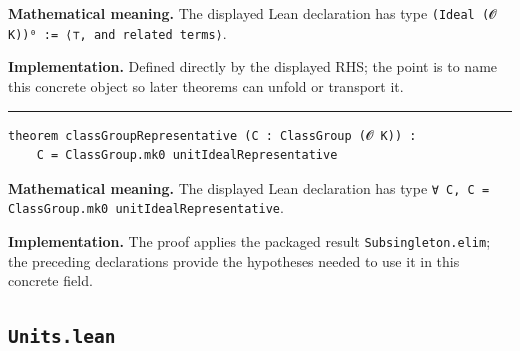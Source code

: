 \documentclass[UTF8,a4paper,11pt,fontset=fandol]{ctexart}
\theoremstyle{definition}
\newcommand{\statementsep}{\par\medskip\hrule\medskip}
\begin{document}
\noindent\textbf{Mathematical meaning.} The displayed Lean declaration has type \texttt{(Ideal (𝓞 K))⁰ := ⟨⊤, and related terms⟩}.\par
\noindent\textbf{Implementation.} Defined directly by the displayed RHS; the point is to name this concrete object so later theorems can unfold or transport it.\par
\statementsep
\begin{verbatim}
theorem classGroupRepresentative (C : ClassGroup (𝓞 K)) :
    C = ClassGroup.mk0 unitIdealRepresentative
\end{verbatim}
\noindent\textbf{Mathematical meaning.} The displayed Lean declaration has type \texttt{∀ C, C = ClassGroup.\allowbreak{}mk0 unitIdealRepresentative}.\par
\noindent\textbf{Implementation.} The proof applies the packaged result \texttt{Subsingleton.\allowbreak{}elim}; the preceding declarations provide the hypotheses needed to use it in this concrete field.\par

\subsection{\texttt{Units.lean}}
\end{document}
